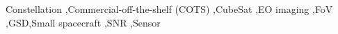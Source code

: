 \documentclass[final,5p,times,sort&compress,twocolumn]{elsarticle}
\begin{document}
\begin{frontmatter}

\begin{keyword}
	Constellation  \sep Commercial-off-the-shelf (COTS) \sep CubeSat  \sep  EO imaging \sep  FoV \sep GSD\sep Small spacecraft \sep  SNR \sep  Sensor 


\end{keyword}
\end{frontmatter}
\end{document}

